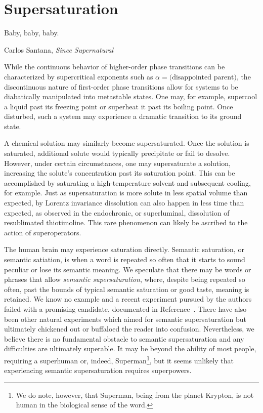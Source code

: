 \section{Supersaturation}

\epigraph{Baby, baby, baby.
}{Carlos Santana, \textit{Since Supernatural}}

While the continuous behavior of higher-order phase transitions can be characterized by supercritical exponents such as $\alpha=\text{(disappointed parent)}$, the discontinuous nature of first-order phase transitions allow for systems to be diabatically manipulated into metastable states.
One may, for example, supercool a liquid past its freezing point or superheat it past its boiling point.
Once disturbed, such a system may experience a dramatic transition to its ground state.


A chemical solution may similarly become supersaturated.
Once the solution is saturated, additional solute would typically precipitate or fail to desolve.
However, under certain circumstances, one may supersaturate a solution, increasing the solute's concentration past its saturation point.
This can be accomplished by saturating a high-temperature solvent and subsequent cooling, for example.
Just as supersaturation is more solute in less spatial volume than expected, by Lorentz invariance dissolution can also happen in less time than expected, as observed in the endochronic, or superluminal, dissolution of resublimated thiotimoline\cite{asimov:1948,asimov:1953,asimov:1960,vernon:2022}.
This rare phenomenon can likely be ascribed to the action of superoperators\cite{Deutsch:1991nm}.

The human brain may experience saturation directly.
Semantic saturation, or semantic satiation, is when a word is repeated so often that it starts to sound peculiar or lose its semantic meaning.
We speculate that there may be words or phrases that allow \emph{semantic supersaturation}, where, despite being repeated so often, past the bounds of typical semantic saturation or good taste, meaning is retained.
We know no example and a recent experiment pursued by the authors failed with a promising candidate, documented in Reference~\cite{self}.
There have also been other natural experiments which aimed for semantic supersaturation but ultimately chickened out\cite{chicken} or buffaloed the reader into confusion\cite{buffalo}.
Nevertheless, we believe there is no fundamental obstacle to semantic supersaturation and any difficulties are ultimately superable.
It may be beyond the ability of most people, requiring a superhuman or, indeed, Superman\footnote{We do note, however, that Superman, being from the planet Krypton, is not human in the biological sense of the word.}\cite{tippett:2009}, but it seems unlikely that experiencing semantic supersaturation requires superpowers.
